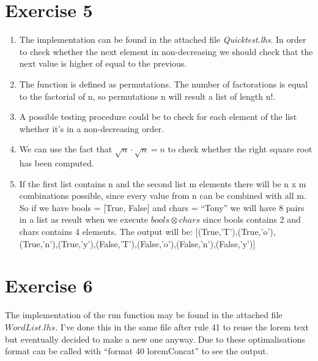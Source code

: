 \documentclass{article}
\begin{document}
\section*{Exercise 5}
\begin{enumerate}
  \item The implementation can be found in the attached file \emph{Quicktest.lhs}. In order to check whether the next element in non-decreasing we should check that the next value is higher of equal to the previous.
  \item The function is defined as permutations. The number of factorations is equal to the factorial of n, so permutations n will result a list of length n!.
  \item A possible testing procedure could be to check for each element of the list whether it's in a non-decreasing order.
  \item We can use the fact that $\sqrt{n} \cdot \sqrt{n} = n$ to check whether the right square root has been computed.
  \item If the first list contains n and the second list m elements there will be n x m combinations possible, since every value from n can be combined with all m. So if we have bools = [True, False] and chars = ``Tony'' we will have 8 pairs in a list as result when we execute $bools \otimes chars$ since bools contains 2 and chars contains 4 elements. The output will be:  [(True,'T'),(True,'o'),(True,'n'),(True,'y'),(False,'T'),(False,'o'),(False,'n'),(False,'y')]
\end{enumerate}

\section*{Exercise 6}
The implementation of the run function may be found in the attached file $WordList.lhs$. I've done this in the same file after rule 41 to reuse the lorem text but eventually decided to make a new one anyway. Due to these optimalisations format can be called with ``format 40 loremConcat'' to see the output.
\end{document}
